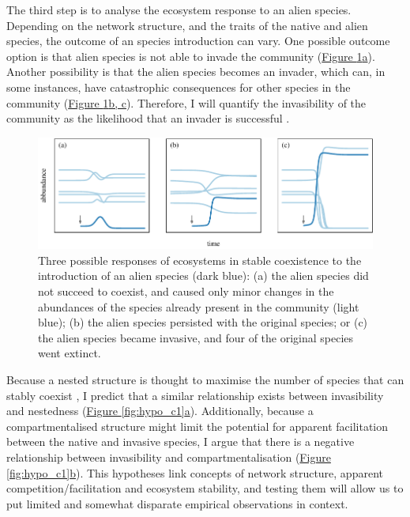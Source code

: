 \documentclass[a4paper]{article}
\begin{document}
The third step is to analyse the ecosystem response to an alien species.
Depending on the network structure, and the traits of the native and alien species, the outcome of an species introduction can vary.
One possible outcome option is that alien species is not able to invade the community (\hyperref[fig:dynamics]{Figure \ref{fig:dynamics}a}).
Another possibility is that the alien species becomes an invader, which can, in some instances, have catastrophic consequences for other species in the community (\hyperref[fig:dynamics]{Figure \ref{fig:dynamics}b, c}).
Therefore, I will quantify the invasibility of the community as the likelihood that an invader is successful \autocite{Ives2007, Romanuk2009}.

\begin{figure}[tbp]
  \includegraphics{dynamics}
  \caption{
  \label{fig:dynamics}
  Three possible responses of ecosystems in stable coexistence to the introduction of an alien species (dark blue):
  (a) the alien species did not succeed to coexist, and caused only minor changes in the abundances of the species already present in the community (light blue);
  (b) the alien species persisted with the original species; or
  (c) the alien species became invasive, and four of the original species went extinct.
  }
\end{figure}

Because a nested structure is thought to maximise the number of species that can stably coexist \autocite{Bastolla2009}, I predict that a similar relationship exists between invasibility and nestedness (\hyperref[fig:hypo_c1]{Figure \ref{fig:hypo_c1}a}).
Additionally, because a compartmentalised structure might limit the potential for apparent facilitation between the native and invasive species, I argue that there is a negative relationship between invasibility and compartmentalisation (\hyperref[fig:hypo_c1]{Figure \ref{fig:hypo_c1}b}).
This hypotheses link concepts of network structure, apparent competition/facilitation and ecosystem stability, and testing them will allow us to put limited and somewhat disparate empirical observations in context.
\end{document}
